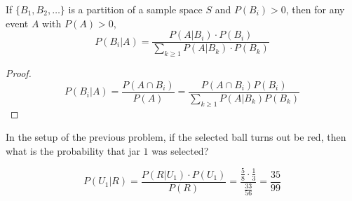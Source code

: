 \begin{theorem}
    If $\lbrace B_1, B_2, \dots \rbrace$ is a partition of a sample space $S$
and $P(B_i) > 0$, then for any event $A$ with $P(A) > 0$,
\begin{equation*}
    P(B_i \vert A) = \frac{P(A \vert B_i) \cdot P(B_i)}
                          {\sum_{k \geq 1} P(A \vert B_k) \cdot P(B_k)}
\end{equation*}
\end{theorem}
\begin{proof}
    \begin{equation*}
          P(B_i \vert A) = \frac{P(A \cap B_i)}{P(A)}
        = \frac{P(A \cap B_i) P(B_i)}{\sum_{k \geq 1} P(A \vert B_k) P(B_k)}
    \end{equation*}
\end{proof}

\begin{example}
    In the setup of the previous problem, if the selected ball turns out be
red, then what is the probability that jar $1$ was selected?
\end{example}
\begin{solution}
    \begin{equation*}
        P(U_1 \vert R) = \frac{P(R \vert U_1) \cdot P(U_1)}{P(R)}
                       = \frac{\frac{5}{8} \cdot \frac{1}{3}}
                              {\frac{33}{56}}
                       = \frac{35}{99}
    \end{equation*}
\end{solution}